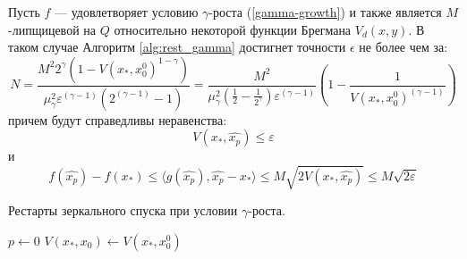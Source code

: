     \begin{theorem}
        Пусть $f$ --- удовлетворяет условию $\gamma$-роста (\ref{gamma-growth}) и также является $M$-липщицевой на $Q$ относительно некоторой функции Брегмана $V_d(x, y)$. В таком случае Алгоритм \ref{alg:rest_gamma} достигнет точности $\epsilon$ не более чем за:
        \begin{equation}
           N = \frac{M^2 2^{\gamma}(1 - V(x_*, x_0^0)^{1 - \gamma}) }{\mu_{\gamma}^2 \varepsilon^{(\gamma-1)} (2^{(\gamma-1)} - 1)} = \frac{M^2}{\mu_{\gamma}^2 (\frac{1}{2} - \frac{1}{2^\gamma}) \varepsilon^{(\gamma-1)} } (1 - \frac{1} {V(x_*, x_0^0)^{(\gamma - 1)}})
        \end{equation}
        причем будут справедливы неравенства:
        \begin{equation}
           V(x_*, \widehat{x_p}) \leq \varepsilon
        \end{equation}
        и
        \begin{equation}
            f(\widehat{x_p}) - f(x_*) \leq  \langle g(\widehat{x_p}), \widehat{x_p} - x_* \rangle \leq M \sqrt{ 2 V(x_*, \widehat{x_p})} \leq M \sqrt{2 \varepsilon}  
        \end{equation}
    \end{theorem}

    \begin{algorithm}[htp]
        \caption{Рестарты зеркального спуска при условии $\gamma$-роста.}
        \label{alg:rest_gamma}
        $p \gets 0$\;
        $V(x_*, x_0) \gets V(x_*,x_0^0)$\;
    \end{algorithm}


